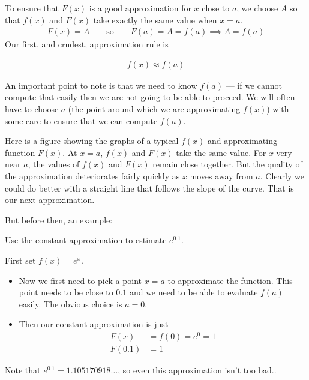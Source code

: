 To ensure that $F(x)$ is a good approximation for $x$ close to $a$, we choose
$A$ so that $f(x)$ and $F(x)$ take exactly the same value when $x=a$.
\begin{align*}
F(x)=A\qquad\text{so}\qquad F(a)=A=f(a)\implies A=f(a)
\end{align*}
Our first, and crudest, approximation rule is
\begin{impeqn}\label{eq:constApprox}
\begin{align*}
f(x)\approx f(a)
\end{align*}
\end{impeqn}
\noindent An important point to note is that we need to know $f(a)$ --- if we cannot
compute that easily then we are not going to be able to proceed. We will often
have to choose $a$ (the point around which we are approximating $f(x)$) with
some care to ensure that we can compute $f(a)$.


Here is a figure showing the graphs of a typical $f(x)$ and approximating
function $F(x)$.
At $x=a$, $f(x)$ and $F(x)$ take the same value. For $x$ very near $a$,
the values of $f(x)$ and $F(x)$ remain close together. But the quality
of the approximation deteriorates fairly quickly as $x$ moves
away from $a$. Clearly we could do better with a straight line that follows the slope of
the curve. That is our next approximation.

But before then, an example:
\begin{eg}\label{eg ex const approx}
 Use the constant approximation to estimate $e^{0.1}$.

\soln First set $f(x) = e^x$.
\begin{itemize}
 \item Now we first need to pick a point $x=a$  to approximate the function. This point
needs to be close to $0.1$ and we need to be able to evaluate $f(a)$ easily. The obvious
choice is $a=0$.
\item Then our constant approximation is just
\begin{align*}
  F(x) &= f(0) = e^0 = 1\\
  F(0.1) &= 1
\end{align*}
\end{itemize}
Note that $e^{0.1} = 1.105170918\dots$, so even this approximation isn't too bad..
\end{eg}






